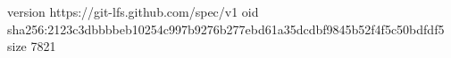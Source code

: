 version https://git-lfs.github.com/spec/v1
oid sha256:2123c3dbbbbeb10254c997b9276b277ebd61a35dcdbf9845b52f4f5c50bdfdf5
size 7821
